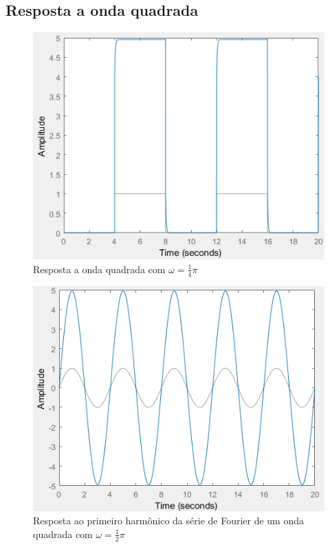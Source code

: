 \documentclass[a4paper, 12pt]{article}
\begin{document}
			\subsection{Resposta a onda quadrada}
			\begin{figure}[!ht]
				\centering
				\includegraphics[scale=0.71]{img/2h.png}
				\caption{Resposta a onda quadrada com $\omega = \frac{1}{4}\pi$}	
			\end{figure}			
			\begin{figure}[!ht]
				\centering
				\includegraphics[scale=0.71]{img/2i.png}
				\caption{Resposta ao primeiro harmônico da série de Fourier de um onda quadrada com $\omega = \frac{1}{2}\pi$}	
			\end{figure}		
\end{document}
